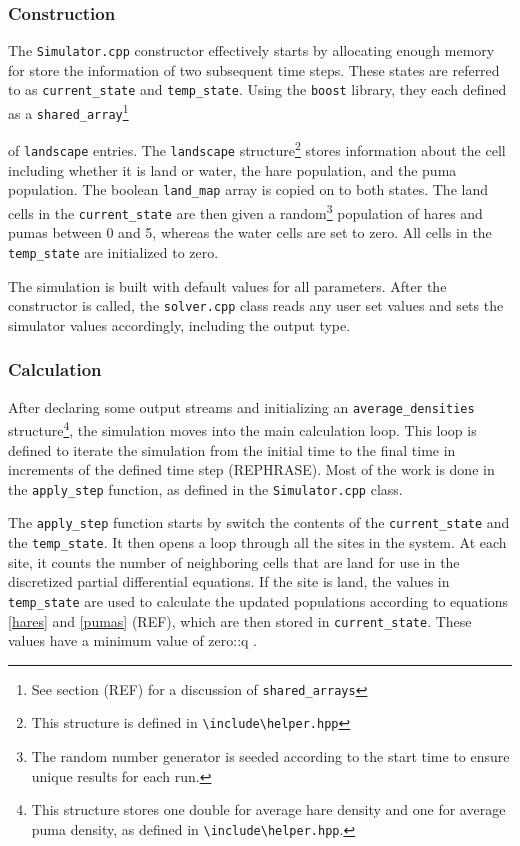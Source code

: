 \documentclass[a4paper,11pt]{article}
\begin{document}
{\subsubsection{Construction}

The \texttt{Simulator.cpp} constructor effectively starts by allocating enough memory for store the information of two subsequent time steps.  These states are  referred to as \texttt{current\_state} and \texttt{temp\_state}.  Using the \texttt{boost} library, they each defined as a \texttt{shared\_array}\footnote{See section (REF) for a discussion of \texttt{shared\_arrays}}} of \texttt{landscape} entries.  The \texttt{landscape} structure\footnote{This structure is defined in \texttt{\textbackslash include\textbackslash helper.hpp}} stores information about the cell including whether it is land or water, the hare population, and the puma population. The boolean \texttt{land\_map} array is copied on to both states.  The land cells in the \texttt{current\_state} are then given a random\footnote{The random number generator is seeded according to the start time to ensure unique results for each run.} population of hares and pumas between 0 and 5, whereas the water cells are set to zero.  All cells in the \texttt{temp\_state} are initialized to zero.

The simulation is built with default values for all parameters.  After the constructor is called, the \texttt{solver.cpp} class reads any user set values and sets the simulator values accordingly, including the output type.

\subsubsection{Calculation}

After declaring some output streams and initializing an \texttt{average\_densities} structure\footnote{This structure stores one double for average hare density and one for average puma density, as defined in \texttt{\textbackslash include\textbackslash helper.hpp}.}, the simulation moves into the main calculation loop.  This loop is defined to iterate the simulation from the initial time to the final time in increments of the defined time step (REPHRASE).  Most of the work is done in the \texttt{apply\_step} function, as defined in the \texttt{Simulator.cpp} class.  

The  \texttt{apply\_step} function starts by switch the contents of the  \texttt{current\_state} and the \texttt{temp\_state}.  It then opens a loop through all the sites in the system.  At each site, it counts the number of neighboring cells that are land for use in the discretized partial differential equations.  If the site is land, the values in \texttt{temp\_state} are used to calculate the updated populations according to equations \eqref{hares} and \eqref{pumas} (REF), which are then stored in \texttt{current\_state}.  These values have a minimum value of zero::q
.  
\end{document}
